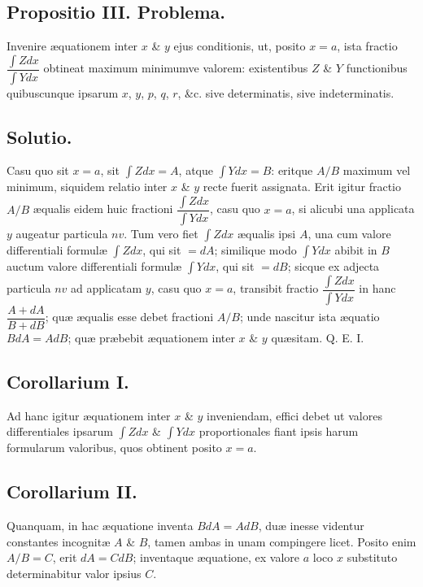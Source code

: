 \subsection*{Propositio III. Problema.}
Invenire æquationem inter $x$ \& $y$ ejus conditionis, ut, posito $x=a$, ista fractio $\dfrac{\int Zdx}{\int Ydx}$ obtineat maximum minimumve valorem: existentibus $Z$ \& $Y$ functionibus quibuscunque ipsarum $x$, $y$, $p$, $q$, $r$, \&c. sive determinatis, sive indeterminatis.
\subsection*{Solutio.}
Casu quo sit $x=a$, sit $\int Zdx=A$, atque $\int Ydx=B$: eritque $A/B$ maximum vel minimum, siquidem relatio inter $x$ \& $y$ recte fuerit assignata. Erit igitur fractio $A/B$ æqualis eidem huic fractioni $\dfrac{\int Zdx}{\int Ydx}$, casu quo $x=a$, si alicubi una applicata $y$ augeatur particula $nv$. Tum vero fiet $\int Zdx$ æqualis ipsi $A$, una cum valore differentiali formulæ $\int Zdx$, qui sit $=dA$; similique modo $\int Ydx$ abibit in $B$ auctum valore differentiali formulæ $\int Ydx$, qui sit $=dB$; sicque ex adjecta particula $nv$ ad applicatam $y$, casu quo $x=a$, transibit fractio $\dfrac{\int Zdx}{\int Ydx}$ in hanc $\dfrac{A+dA}{B+dB}$; quæ æqualis esse debet fractioni $A/B$; unde nascitur ista æquatio $BdA=AdB$; quæ præbebit æquationem inter $x$ \& $y$ quæsitam. Q. E. I.
\subsection*{Corollarium I.}
Ad hanc igitur æquationem inter $x$ \& $y$ inveniendam, effici debet ut valores differentiales ipsarum $\int Zdx$ \& $\int Ydx$ proportionales fiant ipsis harum formularum valoribus, quos obtinent posito $x=a$.
\subsection*{Corollarium II.}
Quanquam, in hac æquatione inventa $BdA=AdB$, duæ inesse videntur constantes incognitæ $A$ \& $B$, tamen ambas in unam compingere licet. Posito enim $A/B=C$, erit $dA=CdB$; inventaque æquatione, ex valore $a$ loco $x$ substituto determinabitur valor ipsius $C$.
